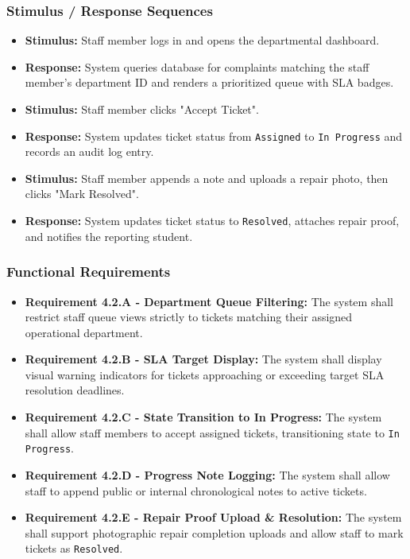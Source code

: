 \documentclass[12pt, a4paper]{article}
\begin{document}
\subsubsection{Stimulus / Response Sequences}
\begin{itemize}[leftmargin=*]
    \item \textbf{Stimulus:} Staff member logs in and opens the departmental dashboard.
    \item \textbf{Response:} System queries database for complaints matching the staff member's department ID and renders a prioritized queue with SLA badges.
    \item \textbf{Stimulus:} Staff member clicks "Accept Ticket".
    \item \textbf{Response:} System updates ticket status from \texttt{Assigned} to \texttt{In Progress} and records an audit log entry.
    \item \textbf{Stimulus:} Staff member appends a note and uploads a repair photo, then clicks "Mark Resolved".
    \item \textbf{Response:} System updates ticket status to \texttt{Resolved}, attaches repair proof, and notifies the reporting student.
\end{itemize}

\subsubsection{Functional Requirements}
\begin{itemize}[leftmargin=*]
    \item \textbf{Requirement 4.2.A - Department Queue Filtering:} The system shall restrict staff queue views strictly to tickets matching their assigned operational department.
    \item \textbf{Requirement 4.2.B - SLA Target Display:} The system shall display visual warning indicators for tickets approaching or exceeding target SLA resolution deadlines.
    \item \textbf{Requirement 4.2.C - State Transition to In Progress:} The system shall allow staff members to accept assigned tickets, transitioning state to \texttt{In Progress}.
    \item \textbf{Requirement 4.2.D - Progress Note Logging:} The system shall allow staff to append public or internal chronological notes to active tickets.
    \item \textbf{Requirement 4.2.E - Repair Proof Upload \& Resolution:} The system shall support photographic repair completion uploads and allow staff to mark tickets as \texttt{Resolved}.
\end{itemize}
\end{document}
